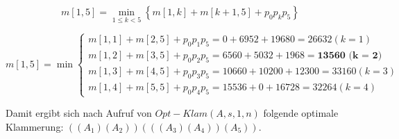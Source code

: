 \documentclass{article}
\begin{document}
\begin{equation}
m[1, 5] = \min\limits_{1 \leq k < 5} \left\{ m[1, k] + m[k + 1, 5] + p_0p_kp_5 \right\}
\end{equation}

\begin{equation}
m[1, 5] = \min\begin{cases}
  m[1, 1] + m[2, 5] + p_0p_1p_5 = 0 + 6952 + 19680 = 26632 (k = 1) \\
  m[1, 2] + m[3, 5] + p_0p_2p_5 = 6560 + 5032 + 1968 = \textbf{13560 (k = 2)} \\
  m[1, 3] + m[4, 5] + p_0p_3p_5 = 10660 + 10200 + 12300 = 33160 (k = 3) \\
  m[1, 4] + m[5, 5] + p_0p_4p_5 = 15536 + 0 + 16728 = 32264 (k = 4)
\end{cases}
\end{equation}

Damit ergibt sich nach Aufruf von $Opt-Klam(A, s, 1, n)$ folgende optimale
Klammerung:
$\left( \left( A_1 \right) \left( A_2 \right) \right) \left( \left( \left( A_3 \right) \left( A_4 \right) \right) \left( A_5 \right) \right)$.
\end{document}
